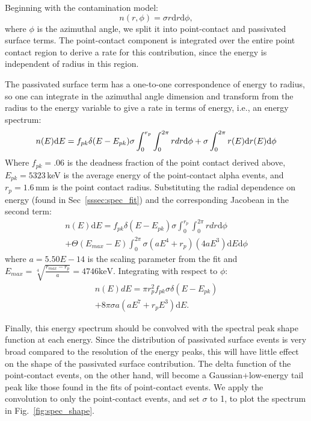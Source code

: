 Beginning with the contamination model:
$$n(r, \phi) = \sigma r \mathrm{d}r \mathrm{d}\phi, $$
where $\phi$ is the azimuthal angle, we split it into point-contact and passivated surface terms. The point-contact component is integrated over the entire point contact region to derive a rate for this contribution, since the energy is independent of radius in this region. 

The passivated surface term has a one-to-one correspondence of energy to radius, so one can integrate in the azimuthal angle dimension and transform from the radius to the energy variable to give a rate in terms of energy, i.e., an energy spectrum:
$$n(E)\mathrm{d}E =  f_{pk}\delta(E-E_{pk})\sigma \int_{0}^{r_p} \int_{0}^{2\pi}r{d}r \mathrm{d}\phi \\
+ \sigma \int_{0}^{2\pi}r(E)\mathrm{d}r(E) \mathrm{d}\phi 
$$
Where $f_{pk} = .06$ is the deadness fraction of the point contact derived above, $E_{pk}= 5323$\,keV is the average energy of the point-contact alpha events, and $r_p = 1.6$\,mm is the point contact radius. Substituting the radial dependence on energy (found in Sec~\ref{sssec:spec_fit}) and the corresponding Jacobean in the second term:
\begin{equation}
\begin{split}
n(E)\mathrm{d}E = f_{pk}\delta(E-E_{pk})\sigma \int_{0}^{r_p} \int_{0}^{2\pi}r{d}r \mathrm{d}\phi \\
+  \Theta(E_{max}-E)\int_{0}^{2\pi}\sigma(aE^4 + r_p)(4aE^3)\mathrm{d}E \mathrm{d}\phi
\end{split}
\end{equation}
\vspace{1cm}
where $a = 5.50E-14$ is the scaling parameter from the fit and $E_{max} = \sqrt[4]{\frac{r_{max}-r_p}{a}} = 4746\mathrm{keV}$. 
Integrating with respect to $\phi$:
\begin{equation}
\begin{split}
n(E)dE = \pi r_p^2 f_{pk}\sigma\delta(E-E_{pk}) \\
+ 8\pi \sigma a (aE^7 + r_pE^3) \mathrm{d}E.
\end{split}
\end{equation}

Finally, this energy spectrum should be convolved with the spectral peak shape function at each energy. Since the distribution of passivated surface events is very broad compared to the resolution of the energy peaks, this will have little effect on the shape of the passivated surface contribution. The delta function of the point-contact events, on the other hand, will become a Gaussian+low-energy tail peak like those found in the fits of point-contact events. We apply the convolution to only the point-contact events, and set $\sigma$ to 1, to plot the spectrum in Fig.~\ref{fig:spec_shape}.
 
